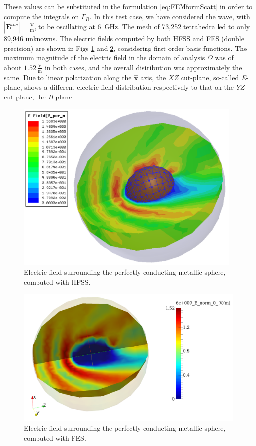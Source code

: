 These values can be substituted in the formulation \ref{eq:FEMformScatt} in order to compute the integrals on $\Gamma_R$. In this test case, we have considered the wave, with $| \mathbf{E}^{inc}| = \frac{\mathrm{V}}{\mathrm{m}}$, to be oscillating at 6~GHz. The mesh of 73,252 tetrahedra led to only 89,946 unknowns. The electric fields computed by both HFSS and FES (double precision) are shown in Figs \ref{fig:SphereHFSS} and \ref{fig:SphereField}, considering first order basis functions. The maximum magnitude of the electric field in the domain of analysis $\Omega$ was of about $1.52~\frac{\mathrm{V}}{\mathrm{m}}$ in both cases, and the overall distribution was approximately the same. Due to linear polarization along the $\hat{\mathbf{x}}$ axis, the $XZ$ cut-plane, so-called \textit{E}-plane, shows a different electric field distribution respectively to that on the $YZ$ cut-plane, the \textit{H}-plane.

\begin{figure}[ht!]
\centering
\includegraphics[width=11cm]{SphereHFSS}
\caption{Electric field surrounding the perfectly conducting metallic sphere, computed with HFSS.}
\label{fig:SphereHFSS}
\end{figure}
\begin{figure}[ht!]
\centering
\includegraphics[width=14cm]{SphereField}
\caption{Electric field surrounding the perfectly conducting metallic sphere, computed with FES.}
\label{fig:SphereField}
\end{figure}

